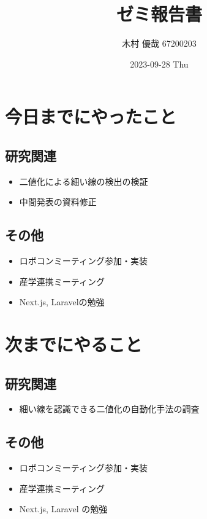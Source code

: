 \documentclass[uplatex, onecolumn, 10pt]{jsarticle}
\begin{document}
\title{\vspace{-40mm}\bf{\LARGE{ゼミ報告書}}}
\author{\vspace{-40mm}木村 優哉 67200203}
\date{2023-09-28 Thu}
\maketitle


\section{今日までにやったこと}

\subsection*{研究関連}
\begin{itemize}
	\item 二値化による細い線の検出の検証
	\item 中間発表の資料修正
\end{itemize}

\subsection*{その他}
\begin{itemize}
	\item ロボコンミーティング参加・実装
	\item 産学連携ミーティング
	\item Next.js, Laravelの勉強
\end{itemize}


\section{次までにやること}

\subsection*{研究関連}
\begin{itemize}
	\item 細い線を認識できる二値化の自動化手法の調査
\end{itemize}

\subsection*{その他}
\begin{itemize}
	\item ロボコンミーティング参加・実装
	\item 産学連携ミーティング
	\item Next.js, Laravel の勉強
\end{itemize}
\end{document}
